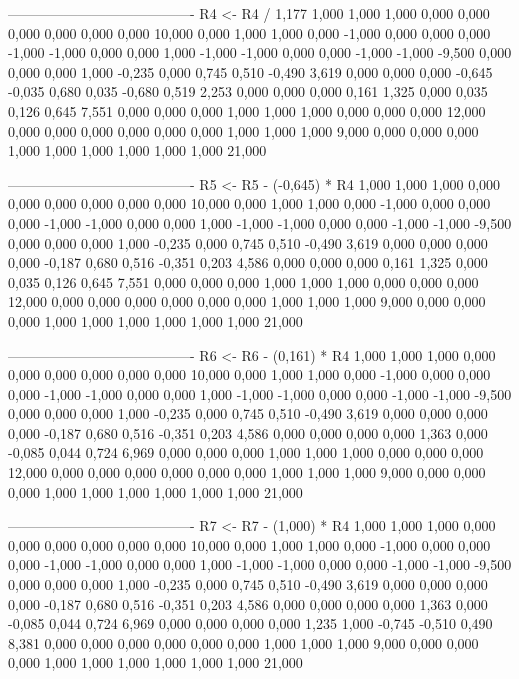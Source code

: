 \documentclass[12pt]{article}
\begin{document}
\begin{enumerate}
\begin{keluaran}
----------------------------------------
R4 <- R4 / 1,177
1,000   1,000   1,000   0,000   0,000   0,000   0,000   0,000   0,000   10,000
0,000   1,000   1,000   0,000   -1,000  0,000   0,000   0,000   -1,000  -1,000
0,000   0,000   1,000   -1,000  -1,000  0,000   0,000   -1,000  -1,000  -9,500
0,000   0,000   0,000   1,000   -0,235  0,000   0,745   0,510   -0,490  3,619
0,000   0,000   0,000   -0,645  -0,035  0,680   0,035   -0,680  0,519   2,253
0,000   0,000   0,000   0,161   1,325   0,000   0,035   0,126   0,645   7,551
0,000   0,000   0,000   1,000   1,000   1,000   0,000   0,000   0,000   12,000
0,000   0,000   0,000   0,000   0,000   0,000   1,000   1,000   1,000   9,000
0,000   0,000   0,000   1,000   1,000   1,000   1,000   1,000   1,000   21,000

----------------------------------------
R5 <- R5 - (-0,645) * R4
1,000   1,000   1,000   0,000   0,000   0,000   0,000   0,000   0,000   10,000
0,000   1,000   1,000   0,000   -1,000  0,000   0,000   0,000   -1,000  -1,000
0,000   0,000   1,000   -1,000  -1,000  0,000   0,000   -1,000  -1,000  -9,500
0,000   0,000   0,000   1,000   -0,235  0,000   0,745   0,510   -0,490  3,619
0,000   0,000   0,000   0,000   -0,187  0,680   0,516   -0,351  0,203   4,586
0,000   0,000   0,000   0,161   1,325   0,000   0,035   0,126   0,645   7,551
0,000   0,000   0,000   1,000   1,000   1,000   0,000   0,000   0,000   12,000
0,000   0,000   0,000   0,000   0,000   0,000   1,000   1,000   1,000   9,000
0,000   0,000   0,000   1,000   1,000   1,000   1,000   1,000   1,000   21,000

----------------------------------------
R6 <- R6 - (0,161) * R4
1,000   1,000   1,000   0,000   0,000   0,000   0,000   0,000   0,000   10,000
0,000   1,000   1,000   0,000   -1,000  0,000   0,000   0,000   -1,000  -1,000
0,000   0,000   1,000   -1,000  -1,000  0,000   0,000   -1,000  -1,000  -9,500
0,000   0,000   0,000   1,000   -0,235  0,000   0,745   0,510   -0,490  3,619
0,000   0,000   0,000   0,000   -0,187  0,680   0,516   -0,351  0,203   4,586
0,000   0,000   0,000   0,000   1,363   0,000   -0,085  0,044   0,724   6,969
0,000   0,000   0,000   1,000   1,000   1,000   0,000   0,000   0,000   12,000
0,000   0,000   0,000   0,000   0,000   0,000   1,000   1,000   1,000   9,000
0,000   0,000   0,000   1,000   1,000   1,000   1,000   1,000   1,000   21,000

----------------------------------------
R7 <- R7 - (1,000) * R4
1,000   1,000   1,000   0,000   0,000   0,000   0,000   0,000   0,000   10,000
0,000   1,000   1,000   0,000   -1,000  0,000   0,000   0,000   -1,000  -1,000
0,000   0,000   1,000   -1,000  -1,000  0,000   0,000   -1,000  -1,000  -9,500
0,000   0,000   0,000   1,000   -0,235  0,000   0,745   0,510   -0,490  3,619
0,000   0,000   0,000   0,000   -0,187  0,680   0,516   -0,351  0,203   4,586
0,000   0,000   0,000   0,000   1,363   0,000   -0,085  0,044   0,724   6,969
0,000   0,000   0,000   0,000   1,235   1,000   -0,745  -0,510  0,490   8,381
0,000   0,000   0,000   0,000   0,000   0,000   1,000   1,000   1,000   9,000
0,000   0,000   0,000   1,000   1,000   1,000   1,000   1,000   1,000   21,000


\end{keluaran}
\end{enumerate}
\end{document}
